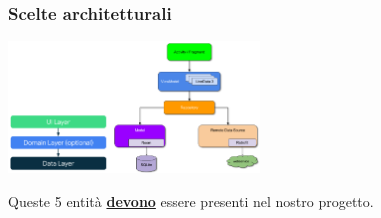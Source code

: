 \subsubsection{Scelte architetturali}
\begin{center}
    \includegraphics[width=0.5\textwidth]{images/00_scelte_architetturali1.png}
\end{center}
\par Queste 5 entità \textbf{\underline{devono}} essere presenti nel nostro progetto.


